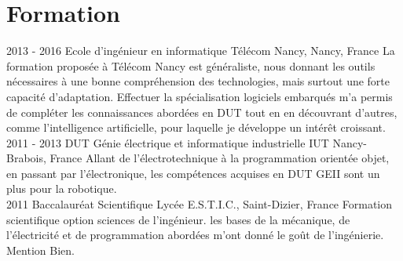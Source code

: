 \documentclass[]{friggeri-cv}
\begin{document}
\section{Formation}
\vspace{0.3cm}
\begin{entrylist}
  \entry
    {2013 - 2016}
    {Ecole d'ingénieur en informatique}
    {Télécom Nancy, Nancy, France}
    {La formation proposée à Télécom Nancy est généraliste, nous donnant les outils nécessaires à une bonne compréhension des technologies, mais surtout une forte capacité d'adaptation. Effectuer la spécialisation logiciels embarqués m'a permis de compléter les connaissances abordées en DUT tout en en découvrant d'autres, comme l'intelligence artificielle, pour laquelle je développe un intérêt croissant.\\}
  \entry
    {2011 - 2013}
    {DUT Génie électrique et informatique industrielle}
    {IUT Nancy-Brabois, France}
    {Allant de l'électrotechnique à la programmation orientée objet, en passant par l'électronique, les compétences acquises en DUT GEII sont un plus pour la robotique.\\}
  \entry
    {2011}
    {Baccalauréat Scientifique}
    {Lycée E.S.T.I.C., Saint-Dizier, France}
    {Formation scientifique option sciences de l'ingénieur. les bases de la mécanique, de l'électricité et de programmation abordées m'ont donné le goût de l'ingénierie. Mention Bien.\\}
\end{entrylist}
\end{document}
